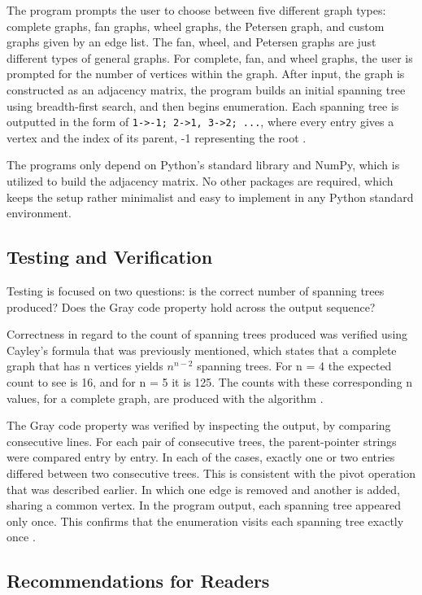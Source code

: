 \documentclass{article}
\begin{document}
The program prompts the user to choose between five different graph types: complete graphs, fan graphs, wheel graphs, the Petersen graph, and custom graphs given by an edge list. The fan, wheel, and Petersen graphs are just different types of general graphs. For complete, fan, and wheel graphs, the user is prompted for the number of vertices within the graph. After input, the graph is constructed as an adjacency matrix, the program builds an initial spanning tree using breadth-first search, and then begins enumeration. Each spanning tree is outputted in the form of \texttt{1->-1; 2->1, 3->2; ...}, where every entry gives a vertex and the index of its parent, -1 representing the root \cite{liu2026}.

The programs only depend on Python's standard library and NumPy, which is utilized to build the adjacency matrix. No other packages are required, which keeps the setup rather minimalist and easy to implement in any Python standard environment. 

\subsection{Testing and Verification}

Testing is focused on two questions: is the correct number of spanning trees produced? Does the Gray code property hold across the output sequence? 

Correctness in regard to the count of spanning trees produced was verified using Cayley's formula that was previously mentioned, which states that a complete graph that has n vertices yields $n^{n-2}$ spanning trees. For n = 4 the expected count to see is 16, and for n = 5 it is 125. The counts with these corresponding n values, for a complete graph, are produced with the algorithm \cite{liu2026}. 

The Gray code property was verified by inspecting the output, by comparing consecutive lines. For each pair of consecutive trees, the parent-pointer strings were compared entry by entry. In each of the cases, exactly one or two entries differed between two consecutive trees. This is consistent with the pivot operation that was described earlier. In which one edge is removed and another is added, sharing a common vertex. In the program output, each spanning tree appeared only once. This confirms that the enumeration visits each spanning tree exactly once \cite{liu2026}. 

\subsection {Recommendations for Readers}
\end{document}
